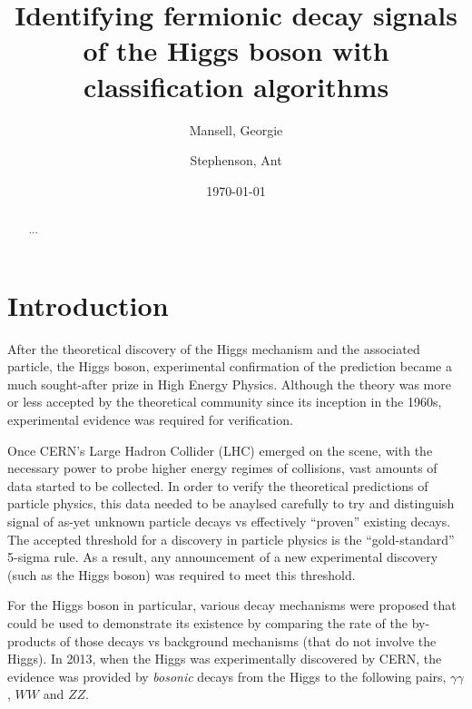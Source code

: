

\usepackage[toc,page]{appendix}
\usepackage{fancyhdr}
\usepackage{enumitem}
\usepackage{pifont}

\graphicspath{{./figs/}}

\pagestyle{fancy}
\rhead{}
\lhead{}

\author{Mansell, Georgie \and Stephenson, Ant}
\date{\today}
\title{Identifying fermionic decay signals of the Higgs boson with classification algorithms}


\maketitle
\begin{abstract}
    ...
\end{abstract}

\section{Introduction}
After the theoretical discovery of the Higgs mechanism and the associated particle, the Higgs boson, experimental confirmation of the prediction became a much sought-after prize in High Energy Physics. Although the theory was more or less accepted by the theoretical community since its inception in the 1960s, experimental evidence was required for verification. 

Once CERN's Large Hadron Collider (LHC) emerged on the scene, with the necessary power to probe higher energy regimes of collisions, vast amounts of data started to be collected. In order to verify the theoretical predictions of particle physics, this data needed to be anaylsed carefully to try and distinguish signal of as-yet unknown particle decays vs effectively ``proven'' existing decays. The accepted threshold for a discovery in particle physics is the ``gold-standard'' 5-sigma rule. As a result, any announcement of a new experimental discovery (such as the Higgs boson) was required to meet this threshold. 

For the Higgs boson in particular, various decay mechanisms were proposed that could be used to demonstrate its existence by comparing the rate of the by-products of those decays vs background mechanisms (that do not involve the Higgs). In 2013, when the Higgs was experimentally discovered by CERN, the evidence was provided by \emph{bosonic} decays from the Higgs to the following pairs, $\gamma\gamma$, $WW$ and $ZZ$. 

